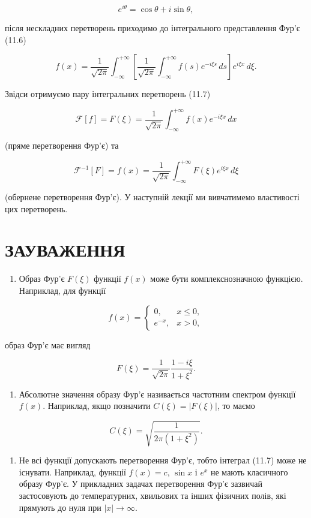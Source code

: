 \documentclass[
  ukrainian,
]{article}
\providecommand{\tightlist}{%
  \setlength{\itemsep}{0pt}\setlength{\parskip}{0pt}}
\begin{document}
\[
e^{i\theta} = \cos\theta + i\sin\theta,
\]

після нескладних перетворень приходимо до інтегрального представлення
Фур'є (11.6)

\[
f(x) = \frac{1}{\sqrt{2\pi}} \int_{-\infty}^{+\infty}
\left[\frac{1}{\sqrt{2\pi}} \int_{-\infty}^{+\infty} f(s)e^{-i\xi s}\,ds \right]
e^{i\xi x}\,d\xi.
\]

Звідси отримуємо пару інтегральних перетворень (11.7)

\[
\mathcal{F}[f] = F(\xi) = \frac{1}{\sqrt{2\pi}} \int_{-\infty}^{+\infty} f(x)e^{-i\xi x}\,dx
\]

(пряме перетворення Фур'є) та

\[
\mathcal{F}^{-1}[F] = f(x) = \frac{1}{\sqrt{2\pi}} \int_{-\infty}^{+\infty} F(\xi)e^{i\xi x}\,d\xi
\]

(обернене перетворення Фур'є). У наступній лекції ми вивчатимемо
властивості цих перетворень.

\section{ЗАУВАЖЕННЯ}\label{ux437ux430ux443ux432ux430ux436ux435ux43dux43dux44f-7}

\begin{enumerate}
\def\labelenumi{\arabic{enumi}.}
\tightlist
\item
  Образ Фур'є \(F(\xi)\) функції \(f(x)\) може бути комплекснозначною
  функцією. Наприклад, для функції
\end{enumerate}

\[
f(x)=
\begin{cases}
0, & x \le 0,\\
e^{-x}, & x > 0,
\end{cases}
\]

образ Фур'є має вигляд

\[
F(\xi) = \frac{1}{\sqrt{2\pi}} \frac{1-i\xi}{1+\xi^2}.
\]

\begin{enumerate}
\def\labelenumi{\arabic{enumi}.}
\setcounter{enumi}{1}
\tightlist
\item
  Абсолютне значення образу Фур'є називається частотним спектром функції
  \(f(x)\). Наприклад, якщо позначити \(C(\xi)=|F(\xi)|\), то маємо
\end{enumerate}

\[
C(\xi) = \sqrt{\frac{1}{2\pi(1+\xi^2)}}.
\]

\begin{enumerate}
\def\labelenumi{\arabic{enumi}.}
\setcounter{enumi}{2}
\tightlist
\item
  Не всі функції допускають перетворення Фур'є, тобто інтеграл (11.7)
  може не існувати. Наприклад, функції \(f(x)=c\), \(\sin x\) і \(e^x\)
  не мають класичного образу Фур'є. У прикладних задачах перетворення
  Фур'є зазвичай застосовують до температурних, хвильових та інших
  фізичних полів, які прямують до нуля при \(|x|\to\infty\).
\end{enumerate}
\end{document}
